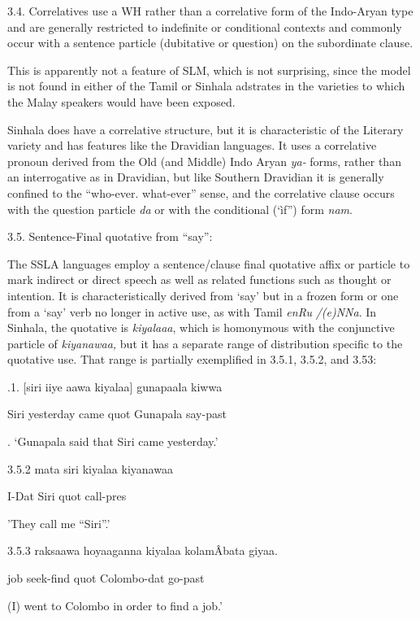 \documentclass[letterpaper]{article}
\begin{document}
3.4. Correlatives use a WH rather than a correlative form of the Indo-Aryan type and are generally restricted to indefinite or conditional contexts and commonly occur with a sentence particle (dubitative or question) on the subordinate clause.

 This is apparently not a feature of SLM, which is not surprising, since the model is not found in either of the Tamil or Sinhala adstrates in the varieties to which the Malay speakers would have been exposed.

 Sinhala does have a correlative structure, but it is characteristic of the Literary variety and has features like the Dravidian languages. It uses a correlative pronoun derived from the Old (and Middle) Indo Aryan \textit{ya-}  forms, rather than an interrogative as in Dravidian, but like Southern Dravidian it is generally confined to the ``who-ever. what-ever{\textquotedblright} sense, and the correlative clause occurs with the question particle \textit{da} or with the conditional (`ìf{\textquotedblright}) form \textit{nam}.

3.5. Sentence-Final quotative from ``say'':

The SSLA languages employ a sentence/clause final quotative affix or particle to mark indirect or direct speech as well as related functions such as thought or intention. It is characteristically derived from `say' but in a frozen form or one from a `say' verb no longer in active use, as with Tamil \textit{enRu} \textit{/(e)NNa}. In Sinhala, the quotative is \textit{kiyalaaa}, which is homonymous with the conjunctive particle of \textit{kiyanawaa,} but it has a separate range of distribution specific to the quotative use. That range is partially exemplified in 3.5.1, 3.5.2, and 3.53:

\ea
{}.1. [siri  iiye  aawa  kiyalaa]  gunapaala kiwwa

   Siri yesterday came  quot  Gunapala  say-past

  . `Gunapala said that Siri came yesterday.'

3.5.2
\ea
\gll  mat{\dag}a siri kiyalaa kiyanawaa

I-Dat Siri quot call-pres

'They call me ``Siri''.'

 3.5.3 
\ea
\gll raksaawa hoyaaganna kiyalaa kolam\^Abat{\dag}a giyaa.

  job  seek-find  quot Colombo-dat go-past

  (I) went to Colom{\textmu}bo in order to find a job.'
\end{document}
